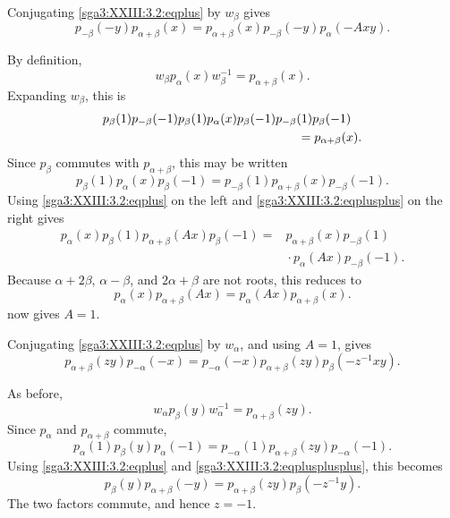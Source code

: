 Conjugating \eqref{sga3:XXIII:3.2:eqplus} by \(w_\beta\) gives
\begin{equation}
  p_{-\beta}(-y)p_{\alpha+\beta}(x)
    =p_{\alpha+\beta}(x)p_{-\beta}(-y)p_\alpha(-Axy).
  \tag{++}
  \label{sga3:XXIII:3.2:eqplusplus}
\end{equation}

By definition,
\[
  w_\beta p_\alpha(x)w_\beta^{-1}=p_{\alpha+\beta}(x).
\]
Expanding \(w_\beta\), this is
\[
\begin{aligned}
  &p_\beta(1)p_{-\beta}(-1)p_\beta(1)p_\alpha(x)
    p_\beta(-1)p_{-\beta}(1)p_\beta(-1)\\
  &\hspace{55mm}=p_{\alpha+\beta}(x).
\end{aligned}
\]
Since \(p_\beta\) commutes with \(p_{\alpha+\beta}\), this may be
written
\[
  p_\beta(1)p_\alpha(x)p_\beta(-1)
    =p_{-\beta}(1)p_{\alpha+\beta}(x)p_{-\beta}(-1).
\]
Using \eqref{sga3:XXIII:3.2:eqplus} on the left and
\eqref{sga3:XXIII:3.2:eqplusplus} on the right gives
\[
\begin{aligned}
  p_\alpha(x)p_\beta(1)p_{\alpha+\beta}(Ax)p_\beta(-1)
   ={}&p_{\alpha+\beta}(x)p_{-\beta}(1)\\
     &{}\cdot p_\alpha(Ax)p_{-\beta}(-1).
\end{aligned}
\]
Because \(\alpha+2\beta\), \(\alpha-\beta\), and
\(2\alpha+\beta\) are not roots, this reduces to
\[
  p_\alpha(x)p_{\alpha+\beta}(Ax)
    =p_\alpha(Ax)p_{\alpha+\beta}(x).
\]
 now gives \(A=1\).

Conjugating \eqref{sga3:XXIII:3.2:eqplus} by \(w_\alpha\), and using
\(A=1\), gives
\begin{equation}
  p_{\alpha+\beta}(zy)p_{-\alpha}(-x)
   =p_{-\alpha}(-x)p_{\alpha+\beta}(zy)
      p_\beta(-z^{-1}xy).
  \tag{+++}
  \label{sga3:XXIII:3.2:eqplusplusplus}
\end{equation}

As before,
\[
  w_\alpha p_\beta(y)w_\alpha^{-1}=p_{\alpha+\beta}(zy).
\]
Since \(p_\alpha\) and \(p_{\alpha+\beta}\) commute,
\[
  p_\alpha(1)p_\beta(y)p_\alpha(-1)
    =p_{-\alpha}(1)p_{\alpha+\beta}(zy)p_{-\alpha}(-1).
\]
Using \eqref{sga3:XXIII:3.2:eqplus} and
\eqref{sga3:XXIII:3.2:eqplusplusplus}, this becomes
\[
  p_\beta(y)p_{\alpha+\beta}(-y)
    =p_{\alpha+\beta}(zy)p_\beta(-z^{-1}y).
\]
The two factors commute, and hence \(z=-1\).

